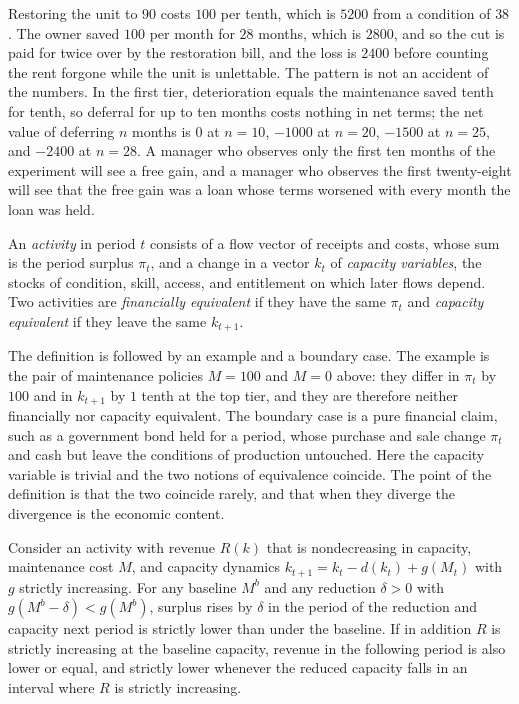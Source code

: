 Restoring the unit to $90$ costs $100$ per tenth, which is $5200$ from a condition of $38$. The owner saved $100$ per month for $28$ months, which is $2800$, and so the cut is paid for twice over by the restoration bill, and the loss is $2400$ before counting the rent forgone while the unit is unlettable. The pattern is not an accident of the numbers. In the first tier, deterioration equals the maintenance saved tenth for tenth, so deferral for up to ten months costs nothing in net terms; the net value of deferring $n$ months is $0$ at $n=10$, $-1000$ at $n=20$, $-1500$ at $n=25$, and $-2400$ at $n=28$. A manager who observes only the first ten months of the experiment will see a free gain, and a manager who observes the first twenty-eight will see that the free gain was a loan whose terms worsened with every month the loan was held.

\begin{definition}\label{def:income-capacity}
An \emph{activity} in period $t$ consists of a flow vector of receipts and costs, whose sum is the period surplus $\pi_t$, and a change in a vector $k_t$ of \emph{capacity variables}, the stocks of condition, skill, access, and entitlement on which later flows depend. Two activities are \emph{financially equivalent} if they have the same $\pi_t$ and \emph{capacity equivalent} if they leave the same $k_{t+1}$.
\end{definition}

The definition is followed by an example and a boundary case. The example is the pair of maintenance policies $M=100$ and $M=0$ above: they differ in $\pi_t$ by $100$ and in $k_{t+1}$ by $1$ tenth at the top tier, and they are therefore neither financially nor capacity equivalent. The boundary case is a pure financial claim, such as a government bond held for a period, whose purchase and sale change $\pi_t$ and cash but leave the conditions of production untouched. Here the capacity variable is trivial and the two notions of equivalence coincide. The point of the definition is that the two coincide rarely, and that when they diverge the divergence is the economic content.

\begin{proposition}\label{prop:wedge}
Consider an activity with revenue $R(k)$ that is nondecreasing in capacity, maintenance cost $M$, and capacity dynamics $k_{t+1}=k_t-d(k_t)+g(M_t)$ with $g$ strictly increasing. For any baseline $M^{b}$ and any reduction $\delta>0$ with $g(M^b-\delta)<g(M^b)$, surplus rises by $\delta$ in the period of the reduction and capacity next period is strictly lower than under the baseline. If in addition $R$ is strictly increasing at the baseline capacity, revenue in the following period is also lower or equal, and strictly lower whenever the reduced capacity falls in an interval where $R$ is strictly increasing.
\end{proposition}

